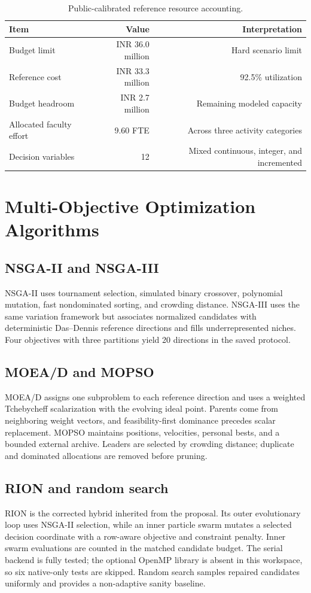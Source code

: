 \documentclass[12pt,a4paper]{report}
\begin{document}
\begin{table}[H]\centering\small
\caption{Public-calibrated reference resource accounting.}
\begin{tabular}{lrr}\toprule Item & Value & Interpretation\\\midrule
Budget limit & INR 36.0 million & Hard scenario limit\\
Reference cost & INR 33.3 million & 92.5\% utilization\\
Budget headroom & INR 2.7 million & Remaining modeled capacity\\
Allocated faculty effort & 9.60 FTE & Across three activity categories\\
Decision variables & 12 & Mixed continuous, integer, and incremented\\\bottomrule
\end{tabular}
\end{table}

\chapter{Multi-Objective Optimization Algorithms}
\section{NSGA-II and NSGA-III}
NSGA-II uses tournament selection, simulated binary crossover, polynomial mutation, fast nondominated sorting, and crowding distance. NSGA-III uses the same variation framework but associates normalized candidates with deterministic Das--Dennis reference directions and fills underrepresented niches. Four objectives with three partitions yield 20 directions in the saved protocol.

\section{MOEA/D and MOPSO}
MOEA/D assigns one subproblem to each reference direction and uses a weighted Tchebycheff scalarization with the evolving ideal point. Parents come from neighboring weight vectors, and feasibility-first dominance precedes scalar replacement. MOPSO maintains positions, velocities, personal bests, and a bounded external archive. Leaders are selected by crowding distance; duplicate and dominated allocations are removed before pruning.

\section{RION and random search}
RION is the corrected hybrid inherited from the proposal. Its outer evolutionary loop uses NSGA-II selection, while an inner particle swarm mutates a selected decision coordinate with a row-aware objective and constraint penalty. Inner swarm evaluations are counted in the matched candidate budget. The serial backend is fully tested; the optional OpenMP library is absent in this workspace, so six native-only tests are skipped. Random search samples repaired candidates uniformly and provides a non-adaptive sanity baseline.
\end{document}
